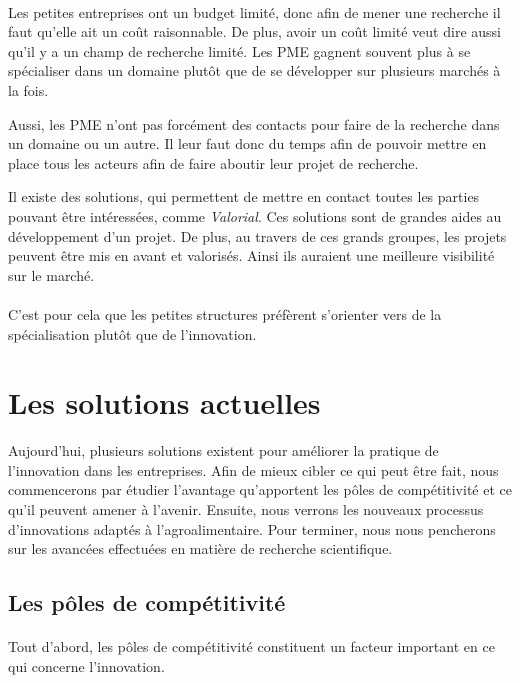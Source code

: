 \documentclass[a4paper,12pt]{report}
\begin{document}
		\paragraph{}Les petites entreprises ont un budget limité, donc afin de mener une recherche il faut qu’elle ait un coût raisonnable. De plus, avoir un coût limité veut dire aussi qu’il y a un champ de recherche limité. Les PME gagnent souvent plus à se spécialiser dans un domaine plutôt que de se développer sur plusieurs marchés à la fois.
		
		Aussi, les PME n’ont pas forcément des contacts pour faire de la recherche dans un domaine ou un autre. Il leur faut donc du temps afin de pouvoir mettre en place tous les acteurs afin de faire aboutir leur projet de recherche.
		
		Il existe des solutions, qui permettent de mettre en contact toutes les parties pouvant être intéressées, comme \textit{Valorial}. Ces solutions sont de grandes aides au développement d’un projet. De plus, au travers de ces grands groupes, les projets peuvent être mis en avant et valorisés. Ainsi ils auraient une meilleure visibilité sur le marché. 
		
		\paragraph{}C'est pour cela que les petites structures préfèrent s'orienter vers de la spécialisation plutôt que de l'innovation.
	
	\section{Les solutions actuelles}
		Aujourd’hui, plusieurs solutions existent pour améliorer la pratique de l’innovation dans les entreprises. Afin de mieux cibler ce qui peut être fait, nous commencerons par étudier l’avantage qu’apportent les pôles de compétitivité et ce qu’il peuvent amener à l’avenir. Ensuite, nous verrons les nouveaux processus d’innovations adaptés à l’agroalimentaire. Pour terminer, nous nous pencherons sur les avancées effectuées en matière de recherche scientifique.
		
		\subsection{Les pôles de compétitivité}
		\paragraph{}Tout d’abord, les pôles de compétitivité constituent un facteur important en ce qui concerne l’innovation.
		
\end{document}
